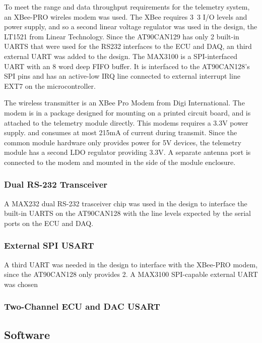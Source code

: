 To meet the range and data throughput requirements for the telemetry system, an XBee-PRO wireles modem was used. The XBee requires \unit{3.3}{\volt} I/O levels and power supply, and so a second linear voltage regulator was used in the design, the LT1521 from Linear Technology. Since the AT90CAN129 has only 2 built-in UARTS that were used for the RS232 interfaces to the ECU and DAQ, an third external UART was added to the design. The MAX3100 is a SPI-interfaced UART with an 8 word deep FIFO buffer. It is interfaced to the AT90CAN128's SPI pins and has an active-low IRQ line connected to external interrupt line EXT7 on the microcontroller. 

The wireless transmitter is an XBee Pro Modem from Digi International. The modem is in a package designed for mounting on a printed circuit board, and is attached to the telemetry module directly. This modems requires a 3.3V power supply. and consumes at most 215mA of current during transmit. Since the common module hardware only provides power for 5V devices, the telemetry module has a second LDO regulator providing 3.3V. A separate antenna port is connected to the modem and mounted in the side of the module enclosure.

\subsubsection{Dual RS-232 Transceiver}

A MAX232 dual RS-232 trasceiver chip was used in the design to interface the built-in UARTS on the AT90CAN128 with the line levels expected by the serial ports on the ECU and DAQ.

\subsubsection{External SPI USART}

A third UART was needed in the design to interface with the XBee-PRO modem, since the AT90CAN128 only provides 2. A MAX3100 SPI-capable external UART was chosen


\subsubsection{Two-Channel ECU and DAC USART}

\subsection{Software}

